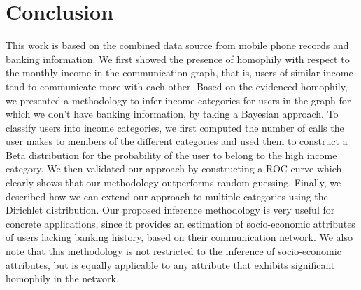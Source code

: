 \section{Conclusion}

This work is based on the combined data source 
from mobile phone records and banking information.
We first showed the presence of homophily with respect to the monthly income in the 
communication graph, that is, users of similar income tend to communicate more with each other. Based on the evidenced homophily, we presented a methodology to infer income categories for users in the graph for which we don't have 
banking information, by taking a Bayesian approach. To classify users into income categories, we first computed the number of calls the user makes to members of the different categories and used them to construct a Beta distribution for the probability of the user to belong to the high income category. We then validated our approach by constructing a ROC curve which clearly shows that our methodology outperforms random guessing.
Finally, we described how we can extend our approach to multiple categories using the Dirichlet distribution.
Our proposed inference methodology is very useful for concrete applications, since it provides an estimation of socio-economic attributes of users lacking banking history, based on their communication network. We also note that this methodology is not restricted to the inference of socio-economic attributes, but is equally applicable to any attribute that exhibits significant homophily in the network.

